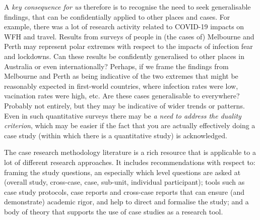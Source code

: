 \documentclass{tufte-handout}
\begin{document}
A \emph{key consequence for us} therefore is to recognise the need to seek generalisable findings, that can be confidentially applied to other places and cases.  For example, there was a lot of research activity related to COVID-19 impacts on WFH and travel. Results from surveys of people in (the cases of) Melbourne and Perth may represent polar extremes with respect to the impacts of infection fear and lockdowns.  Can these results be confidently generalised to other places in Australia or even internationally? Perhaps, if we frame the findings from Melbourne and Perth as being indicative of the two extremes that might be reasonably expected in first-world countries, where infection rates were low, vacination rates were high, etc. Are these cases generalisable to everywhere?  Probably not entirely, but they may be indicative of wider trends or patterns.  Even in such quantitative surveys there may be \emph{a need to address the duality criterion}, which may be easier if the fact that you are actually effectively doing a case study (within which there is a quantitative study) is acknowledged.   

The case research methodology literature is a rich resource that is applicable to a lot of different research approaches. It includes recommendations with respect to: framing the study questions, an especially which level questions are asked at (overall study, cross-case, case, sub-unit, individual participant); tools such as case study protocols, case reports and cross-case reports that can ensure (and demonstrate) academic rigor, and help to direct and formalise the study; and a body of theory that supports the use of case studies as a research tool.  



\end{document}
